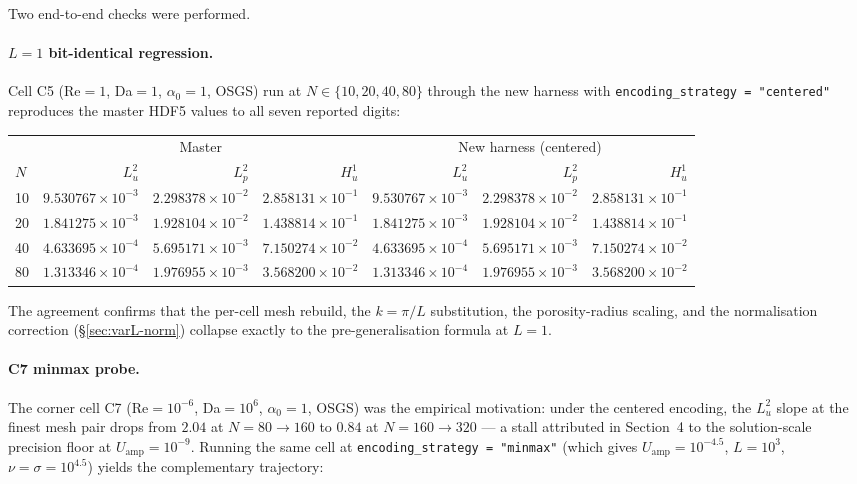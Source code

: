 \documentclass[11pt]{article}
\newcommand{\code}[1]{\texttt{#1}}
\begin{document}
Two end-to-end checks were performed.

\paragraph{$L=1$ bit-identical regression.} Cell C5 (Re$=1$, Da$=1$,
$\alpha_0=1$, OSGS) run at $N \in \{10, 20, 40, 80\}$ through the new
harness with \code{encoding\_strategy = "centered"} reproduces the
master HDF5 values to all seven reported digits:

\begin{center}
\begin{tabular}{lrrr|rrr}
  \toprule
  & \multicolumn{3}{c|}{Master} & \multicolumn{3}{c}{New harness (centered)} \\
  $N$ & $L^2_u$ & $L^2_p$ & $H^1_u$ & $L^2_u$ & $L^2_p$ & $H^1_u$ \\
  \midrule
  10 & $9.530767\!\times\!10^{-3}$ & $2.298378\!\times\!10^{-2}$ & $2.858131\!\times\!10^{-1}$
     & $9.530767\!\times\!10^{-3}$ & $2.298378\!\times\!10^{-2}$ & $2.858131\!\times\!10^{-1}$ \\
  20 & $1.841275\!\times\!10^{-3}$ & $1.928104\!\times\!10^{-2}$ & $1.438814\!\times\!10^{-1}$
     & $1.841275\!\times\!10^{-3}$ & $1.928104\!\times\!10^{-2}$ & $1.438814\!\times\!10^{-1}$ \\
  40 & $4.633695\!\times\!10^{-4}$ & $5.695171\!\times\!10^{-3}$ & $7.150274\!\times\!10^{-2}$
     & $4.633695\!\times\!10^{-4}$ & $5.695171\!\times\!10^{-3}$ & $7.150274\!\times\!10^{-2}$ \\
  80 & $1.313346\!\times\!10^{-4}$ & $1.976955\!\times\!10^{-3}$ & $3.568200\!\times\!10^{-2}$
     & $1.313346\!\times\!10^{-4}$ & $1.976955\!\times\!10^{-3}$ & $3.568200\!\times\!10^{-2}$ \\
  \bottomrule
\end{tabular}
\end{center}

\noindent The agreement confirms that the per-cell mesh rebuild, the
$k = \pi/L$ substitution, the porosity-radius scaling, and the
normalisation correction (§\ref{sec:varL-norm}) collapse exactly to the
pre-generalisation formula at $L = 1$.

\paragraph{C7 minmax probe.} The corner cell C7 (Re$=10^{-6}$,
Da$=10^{6}$, $\alpha_0=1$, OSGS) was the empirical motivation: under the
centered encoding, the $L^2_u$ slope at the finest mesh pair drops from
$2.04$ at $N=80 \to 160$ to $0.84$ at $N=160 \to 320$ — a stall
attributed in Section~4 to the solution-scale precision floor at
$U_{\text{amp}} = 10^{-9}$. Running the same cell at
\code{encoding\_strategy = "minmax"} (which gives $U_{\text{amp}} =
10^{-4.5}$, $L = 10^3$, $\nu = \sigma = 10^{4.5}$) yields the
complementary trajectory:
\end{document}
